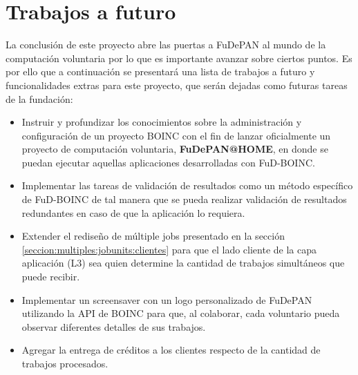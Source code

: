 \chapter{Trabajos a futuro}
\label{chapter:future:work}

La conclusión de este proyecto abre las puertas a FuDePAN al mundo de la computación voluntaria por lo que es importante avanzar sobre ciertos puntos. Es por ello que a continuación se presentará una lista de trabajos a futuro y funcionalidades extras para este proyecto, que serán dejadas como futuras tareas de la fundación:

\begin{itemize}
\item Instruir y profundizar los conocimientos sobre la administración y configuración de un proyecto BOINC con el fin de lanzar oficialmente un proyecto de computación voluntaria, \textbf{FuDePAN@HOME}, en donde se puedan ejecutar aquellas aplicaciones desarrolladas con FuD-BOINC.

\item Implementar las tareas de validación de resultados como un método específico de FuD-BOINC de tal manera que se pueda realizar validación de resultados redundantes en caso de que la aplicación lo requiera.

\item Extender el rediseño de múltiple jobs presentado en la sección \ref{seccion:multiples:jobunits:clientes} para que el lado cliente de la capa aplicación (L3) sea quien determine la cantidad de trabajos simultáneos que puede recibir.

\item Implementar un screensaver con un logo personalizado de FuDePAN utilizando la API de BOINC para que, al colaborar, cada voluntario pueda observar diferentes detalles de sus trabajos.

\item Agregar la entrega de créditos a los clientes respecto de la cantidad de trabajos procesados.

\end{itemize}
